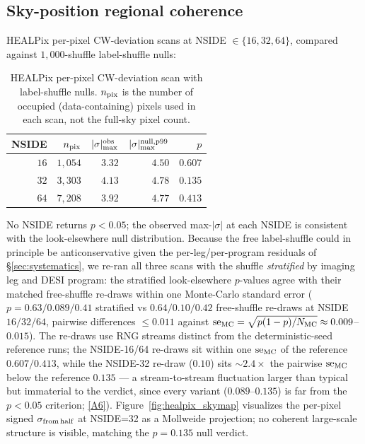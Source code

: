 \documentclass[aps,prd,twocolumn,superscriptaddress,showpacs,preprintnumbers,nofootinbib,longbibliography,floatfix]{revtex4-2}
\newcommand{\repoBase}{https://github.com/Hubify-Projects/bigbounce/blob/main}
\begin{document}
\subsection{Sky-position regional coherence}\label{sec:results_healpix}

HEALPix per-pixel CW-deviation scans at NSIDE $\in \{16, 32, 64\}$,
compared against $1{,}000$-shuffle label-shuffle nulls:

\begin{table}[ht]
\caption{HEALPix per-pixel CW-deviation scan with label-shuffle nulls.
$n_{\rm pix}$ is the number of occupied (data-containing) pixels used
in each scan, not the full-sky pixel count.}
\label{tab:healpix}
\begin{ruledtabular}
\begin{tabular}{rrrrr}
NSIDE & $n_{\rm pix}$ & $|\sigma|^{\rm obs}_{\max}$ &
$|\sigma|^{\rm null,p99}_{\max}$ & $p$ \\
\hline
$16$ & $1{,}054$ & $3.32$ & $4.50$ & $0.607$ \\
$32$ & $3{,}303$ & $4.13$ & $4.78$ & $0.135$ \\
$64$ & $7{,}208$ & $3.92$ & $4.77$ & $0.413$ \\
\end{tabular}
\end{ruledtabular}
\end{table}

No NSIDE returns $p<0.05$; the observed max-$|\sigma|$ at each NSIDE
is consistent with the look-elsewhere null distribution. Because the
free label-shuffle could in principle be anticonservative given the
per-leg/per-program residuals of \S\ref{sec:systematics}, we re-ran
all three scans with the shuffle \emph{stratified} by imaging leg and
DESI program: the stratified look-elsewhere $p$-values agree with
their matched free-shuffle re-draws within one Monte-Carlo standard
error ($p = 0.63 / 0.089 / 0.41$ stratified vs
$0.64 / 0.10 / 0.42$ free-shuffle re-draws at NSIDE $16/32/64$,
pairwise differences $\leq 0.011$ against
${\rm se}_{\rm MC} = \sqrt{p(1-p)/N_{\rm MC}} \approx 0.009$--$0.015$).
The re-draws use RNG streams distinct from the deterministic-seed
reference runs; the NSIDE-16/64 re-draws sit within one
${\rm se}_{\rm MC}$ of the reference $0.607/0.413$, while the NSIDE-32
re-draw ($0.10$) sits ${\sim}2.4\times$ the pairwise
${\rm se}_{\rm MC}$ below the reference $0.135$ --- a stream-to-stream
fluctuation larger than typical but immaterial to the verdict, since
every variant ($0.089$--$0.135$) is far from the $p<0.05$ criterion;
\href{\repoBase/pipelines/p5\_desi\_chirality/outputs/18\_v0151\_stratified\_and\_density.json}{[A6]}).
Figure~\ref{fig:healpix_skymap} visualizes the per-pixel signed
$\sigma_{\rm from\,half}$ at NSIDE=32 as a Mollweide projection; no
coherent large-scale structure is visible, matching the $p\!=\!0.135$
null verdict.
\end{document}
